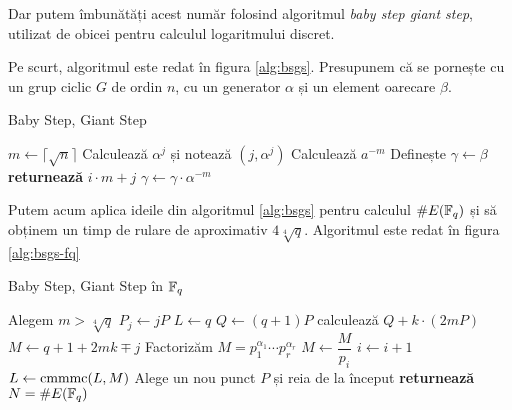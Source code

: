 Dar putem îmbunătăți acest număr folosind algoritmul \emph{baby step giant step},
utilizat de obicei pentru calculul logaritmului discret.

Pe scurt, algoritmul este redat în figura \ref{alg:bsgs}. Presupunem că se
pornește cu un grup ciclic $ G $ de ordin $ n $, cu un generator $ \alpha $
și un element oarecare $ \beta $.

\begin{algorithm}
  \caption{Baby Step, Giant Step}
  \begin{algorithmic}[1]
        \State $ m \gets \lceil \sqrt{n} \rceil $
            \State Calculează $ \alpha^j $ și notează $ (j, \alpha^j) $
        \EndFor
        \State Calculează $ a^{-m} $
        \State Definește $ \gamma \gets \beta $
                \State \textbf{returnează} $ i \cdot m + j $
            \Else
                \State $ \gamma \gets \gamma \cdot \alpha^{-m} $
            \EndIf
        \EndFor
    \EndProcedure
  \end{algorithmic}
  \label{alg:bsgs}
\end{algorithm}

Putem acum aplica ideile din algoritmul \ref{alg:bsgs} pentru calculul
$ \# E(\mathbb{F}_q) $ și să obținem un timp de rulare de aproximativ $ 4\sqrt[4]{q} $.
Algoritmul este redat în figura \ref{alg:bsgs-fq}

\begin{algorithm}
  \caption{Baby Step, Giant Step în $ \mathbb{F}_q $}
  \begin{algorithmic}[1]
        \State Alegem $ m > \sqrt[4]{q} $
            \State $ P_j \gets jP $
        \EndFor
        \State $ L \gets q $
        \State $ Q \gets (q + 1) P $
        \Repeat
            \State calculează $ Q + k \cdot (2mP) $
        \State $ M \gets q + 1 + 2mk \mp j $ 
        \State Factorizăm $ M = p_1^{\alpha_1} \cdots p_r^{\alpha_r} $
                \State $ M \gets \dfrac{M}{p_i} $
            \Else
                \State $ i \gets i + 1 $
            \EndIf
        \EndWhile
        \State $ L \gets \mathrm{cmmmc}(L, M) $
            \State Alege un nou punct $ P $ și reia de la început
        \EndWhile
        \State \textbf{returnează} $ N = \# E(\mathbb{F}_q) $
    \EndProcedure
  \end{algorithmic}
  \label{alg:bsgs-fq}
\end{algorithm}

